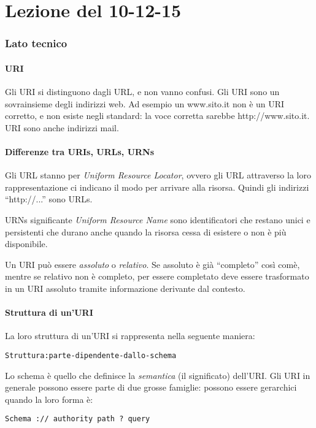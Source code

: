 \section{Lezione del 10-12-15}

\subsubsection{Lato tecnico}

\paragraph*{URI}Gli URI si distinguono dagli URL, e non vanno confusi. Gli URI sono un sovrainsieme degli indirizzi web. Ad esempio un www.sito.it non \`e un URI corretto, e non esiste negli standard: la voce corretta sarebbe http://www.sito.it. URI sono anche indirizzi mail.

\paragraph*{Differenze tra URIs, URLs, URNs}Gli URL stanno per \textit{Uniform Resource Locator}, ovvero gli URL attraverso la loro rappresentazione ci indicano il modo per arrivare alla risorsa. Quindi gli indirizzi ``http://...'' sono URLs.

URNs significante \textit{Uniform Resource Name} sono identificatori che restano unici e persistenti che durano anche quando la risorsa cessa di esistere o non \`e pi\`u disponibile.

Un URI pu\`o essere \textit{assoluto} o \textit{relativo}. Se assoluto \`e gi\`a ``completo'' cos\`i com\`e, mentre se relativo non \`e completo, per essere completato deve essere trasformato in un URI assoluto tramite informazione derivante dal contesto.

\paragraph*{Struttura di un'URI}La loro struttura di un'URI si rappresenta nella seguente maniera:
\begin{verbatim}
Struttura:parte-dipendente-dallo-schema
\end{verbatim}

Lo schema \`e quello che definisce la \textit{semantica} (il significato) dell'URI. Gli URI in generale possono essere parte di due grosse famiglie: possono essere gerarchici quando la loro forma \`e:
\begin{verbatim}
Schema :// authority path ? query
\end{verbatim}

